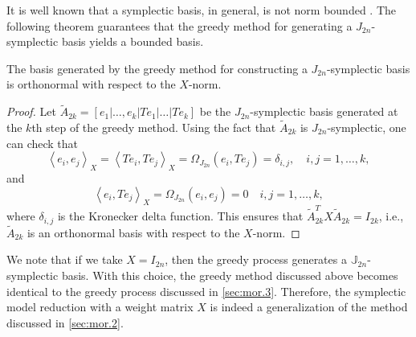 It is well known that a symplectic basis, in general, is not norm bounded \cite{doi:10.1137/050628519}. The following theorem guarantees that the greedy method for generating a $J_{2n}$-symplectic basis yields a bounded basis.
\begin{theorem} \label{thm:3}
The basis generated by the greedy method for constructing a $J_{2n}$-symplectic basis is orthonormal with respect to the $X$-norm.
\end{theorem}
\begin{proof}
Let $\tilde A_{2k}=[e_1|\dots,e_k|Te_1|\dots|Te_k]$ be the $J_{2n}$-symplectic basis generated at the $k$th step of the greedy method. Using the fact that $\tilde A_{2k}$ is $J_{2n}$-symplectic, one can check that
\begin{equation} \label{eq:normmor.12}
	\left\langle e_i,e_j\right\rangle_X = \left\langle Te_i,Te_j\right\rangle_X = \Omega_{J_{2n}}(e_i,Te_j)=\delta_{i,j}, \quad i,j=1,\dots,k,	
\end{equation}
and
\begin{equation} \label{eq:normmor.13}
	\left\langle e_i,Te_j \right\rangle_X = \Omega_{J_{2n}}(e_i,e_j) = 0\quad i,j=1,\dots,k,
\end{equation}
where $\delta_{i,j}$ is the Kronecker delta function. This ensures that $\tilde A_{2k}^TX\tilde A_{2k} = I_{2k}$, i.e., $\tilde A_{2k}$ is an orthonormal basis with respect to the $X$-norm.
\end{proof}
We note that if we take $X=I_{2n}$, then the greedy process generates a $\mathbb J_{2n}$- symplectic basis. With this choice, the greedy method discussed above becomes identical to the greedy process discussed in \cref{sec:mor.3}. Therefore, the symplectic model reduction with a weight matrix $X$ is indeed a generalization of the method discussed in \cref{sec:mor.2}.

